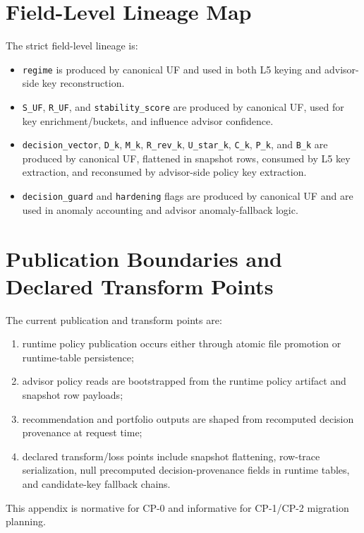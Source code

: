 \section{Field-Level Lineage Map}
The strict field-level lineage is:
\begin{itemize}
    \item \texttt{regime} is produced by canonical UF and used in both L5 keying and advisor-side key reconstruction.
    \item \texttt{S\_UF}, \texttt{R\_UF}, and \texttt{stability\_score} are produced by canonical UF, used for key enrichment/buckets, and influence advisor confidence.
    \item \texttt{decision\_vector}, \texttt{D\_k}, \texttt{M\_k}, \texttt{R\_rev\_k}, \texttt{U\_star\_k}, \texttt{C\_k}, \texttt{P\_k}, and \texttt{B\_k} are produced by canonical UF, flattened in snapshot rows, consumed by L5 key extraction, and reconsumed by advisor-side policy key extraction.
    \item \texttt{decision\_guard} and \texttt{hardening} flags are produced by canonical UF and are used in anomaly accounting and advisor anomaly-fallback logic.
\end{itemize}

\section{Publication Boundaries and Declared Transform Points}
The current publication and transform points are:
\begin{enumerate}[leftmargin=1.2cm]
    \item runtime policy publication occurs either through atomic file promotion or runtime-table persistence;
    \item advisor policy reads are bootstrapped from the runtime policy artifact and snapshot row payloads;
    \item recommendation and portfolio outputs are shaped from recomputed decision provenance at request time;
    \item declared transform/loss points include snapshot flattening, row-trace serialization, null precomputed decision-provenance fields in runtime tables, and candidate-key fallback chains.
\end{enumerate}
This appendix is normative for CP-0 and informative for CP-1/CP-2 migration planning.
